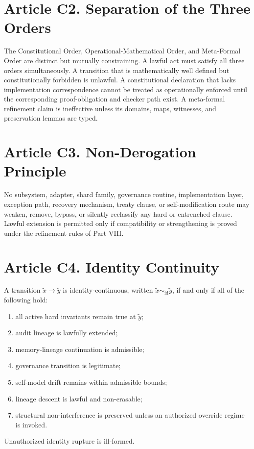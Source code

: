 \documentclass[10pt,oneside]{article}
\theoremstyle{definition}
\theoremstyle{remark}
\newcommand{\id}{\mathrm{id}}
\begin{document}
\section{Article C2. Separation of the Three Orders}
The Constitutional Order, Operational-Mathematical Order, and Meta-Formal Order are distinct but mutually constraining. A lawful act must satisfy all three orders simultaneously. A transition that is mathematically well defined but constitutionally forbidden is unlawful. A constitutional declaration that lacks implementation correspondence cannot be treated as operationally enforced until the corresponding proof-obligation and checker path exist. A meta-formal refinement claim is ineffective unless its domains, maps, witnesses, and preservation lemmas are typed.

\section{Article C3. Non-Derogation Principle}
No subsystem, adapter, shard family, governance routine, implementation layer, exception path, recovery mechanism, treaty clause, or self-modification route may weaken, remove, bypass, or silently reclassify any hard or entrenched clause. Lawful extension is permitted only if compatibility or strengthening is proved under the refinement rules of Part VIII.

\section{Article C4. Identity Continuity}
A transition \(\widetilde{x}\to\widetilde{y}\) is identity-continuous, written \(\widetilde{x}\sim_{\id}\widetilde{y}\), if and only if all of the following hold:
\begin{enumerate}
  \item all active hard invariants remain true at \(\widetilde{y}\);
  \item audit lineage is lawfully extended;
  \item memory-lineage continuation is admissible;
  \item governance transition is legitimate;
  \item self-model drift remains within admissible bounds;
  \item lineage descent is lawful and non-erasable;
  \item structural non-interference is preserved unless an authorized override regime is invoked.
\end{enumerate}
Unauthorized identity rupture is ill-formed.
\end{document}
